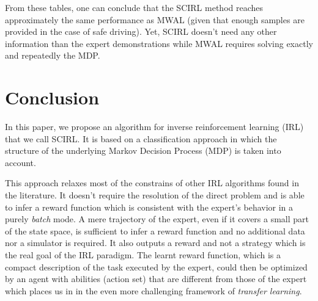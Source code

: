 \documentclass[tablecaption=bottom]{jmlr}
\begin{document}
From these tables, one can conclude that the SCIRL method reaches
approximately the same performance as MWAL (given that enough
samples are provided in the case of safe driving). Yet, SCIRL
doesn't need any other information than the expert demonstrations
while MWAL requires solving exactly and repeatedly the MDP.

\section{Conclusion}

In this paper, we propose an algorithm for inverse reinforcement
learning (IRL) that we call SCIRL. It is based on a classification
approach in which the structure of the underlying Markov Decision
Process (MDP) is taken into account.

This approach relaxes most of the constrains of other IRL algorithms
found in the literature. It doesn't require the resolution of the
direct problem and is able to infer a reward function which is
consistent with the expert's behavior in a purely \emph{batch} mode.
%
%
A mere trajectory of the expert, even if it covers a small part of
the state space, is sufficient to infer a reward function and no
additional data nor a simulator is required. It also outputs a
reward and not a strategy which is the real goal of the IRL
paradigm. The learnt reward function, which is a compact description
of the task executed by the expert, could then be optimized by an
agent with abilities (action set) that are different from those of
the expert which places us in in the even more challenging framework
of \emph{transfer learning}.
%
\end{document}
